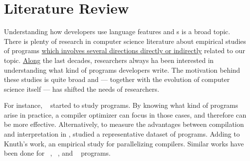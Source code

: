 



\chapter{Literature Review}
\label{cha:literature-review}

Understanding how developers use language features and \api{}s is a broad topic.
There is plenty of research in
computer science literature about empirical studies of programs
\underline{which involves several directions directly or indirectly} related to our topic.
\underline{Along} the last decades, researchers always ha been interested in understanding what kind of programs developers write.
The motivation behind these studies is quite broad and --- together with the evolution of computer science itself --- has
shifted  the needs of researchers.

For instance, ~\cite{knuthEmpiricalStudyFORTRAN1971} started to study \fortran{} programs.
By knowing what kind of programs arise in practice,
a compiler optimizer can focus in those cases,
and therefore can be more effective.
Alternatively, to measure the advantages between compilation and interpretation in \basic{}, \cite{hammondBASICEvaluationProcessing1977}  studied a representative dataset of programs.
Adding to Knuth's work, \cite{shenEmpiricalStudyFortran1990}  an empirical study for parallelizing compilers.
Similar works have been done for \cobol{}~\cite{salvadoriStaticProfileCOBOL1975,chevanceStaticProfileDynamic1978}, \pascal{}~\cite{cookContextualAnalysisPascal1982}, and \apl{}~\cite{saalPropertiesAPLPrograms1975,saalEmpiricalStudyAPL1977} programs. 

